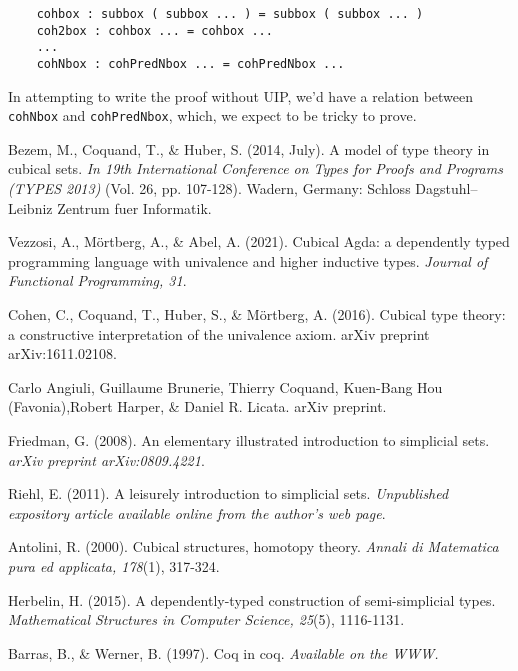 \documentclass[10pt]{art}
\begin{document}
\begin{listing}[H]
  \begin{verbatim}
    cohbox : subbox ( subbox ... ) = subbox ( subbox ... )
    coh2box : cohbox ... = cohbox ...
    ...
    cohNbox : cohPredNbox ... = cohPredNbox ...
  \end{verbatim}
\end{listing}

In attempting to write the proof without UIP, we'd have a relation between \texttt{cohNbox} and \texttt{cohPredNbox}, which, we expect to be tricky to prove.

\begin{thebibliography}{10}
  Bezem, M., Coquand, T., \& Huber, S. (2014, July). A model of type theory in cubical sets. \textit{In 19th International Conference on Types for Proofs and Programs (TYPES 2013)} (Vol. 26, pp. 107-128). Wadern, Germany: Schloss Dagstuhl–Leibniz Zentrum fuer Informatik.

  Vezzosi, A., Mörtberg, A., \& Abel, A. (2021). Cubical Agda: a dependently typed programming language with univalence and higher inductive types. \textit{Journal of Functional Programming, 31}.

  Cohen, C., Coquand, T., Huber, S., \& Mörtberg, A. (2016). Cubical type theory: a constructive interpretation of the univalence axiom. arXiv preprint arXiv:1611.02108.

  Carlo Angiuli, Guillaume Brunerie, Thierry Coquand, Kuen-Bang Hou (Favonia),Robert Harper, \& Daniel R. Licata. arXiv preprint.

  Friedman, G. (2008). An elementary illustrated introduction to simplicial sets. \textit{arXiv preprint arXiv:0809.4221}.

  Riehl, E. (2011). A leisurely introduction to simplicial sets. \textit{Unpublished expository article available online from the author's web page}.

  Antolini, R. (2000). Cubical structures, homotopy theory. \textit{Annali di Matematica pura ed applicata, 178}(1), 317-324.

  Herbelin, H. (2015). A dependently-typed construction of semi-simplicial types. \textit{Mathematical Structures in Computer Science, 25}(5), 1116-1131.

  Barras, B., \& Werner, B. (1997). Coq in coq. \textit{Available on the WWW.}
\end{thebibliography}
\end{document}
